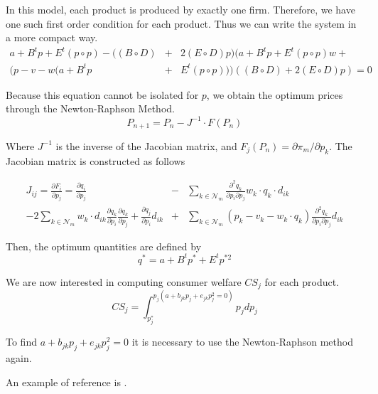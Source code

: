 \documentclass[12pt]{article}
\begin{document}
In this model, each product is produced by exactly one firm. Therefore, we have one such first order condition for each product. Thus we can write the system in a more compact way.
\begin{eqnarray*}
a + B^t p + E^t (p \circ p) - ((B \circ D) &+& 2(E \circ D)p) (a + B^t p + E^t (p \circ p) w + \\
(p - v - w(a + B^t p &+& E^t (p \circ p)))((B \circ D) + 2 (E \circ D) p) = 0
\end{eqnarray*}

Because this equation cannot be isolated for $p$, we obtain the optimum prices through the Newton-Raphson Method.
\begin{equation*}
P_{n+1} = P_n - J^{-1} \cdot F(P_n)
\end{equation*}

Where $J^{-1}$ is the inverse of the Jacobian matrix, and $F_j(P_n) = \partial \pi_m / \partial p_k$. The Jacobian matrix is constructed as follows

\begin{eqnarray*}
J_{ij} = \frac{\partial F_i}{\partial p_j} = \frac{\partial q_i}{\partial p_j} &-& \sum_{k \in \mathcal{N}_m} \frac{\partial^2 q_k}{\partial p_i \partial p_j} w_k \cdot q_k \cdot d_{ik}\\
 - 2\sum_{k \in \mathcal{N}_m} w_k \cdot d_{ik} \frac{\partial q_k}{\partial p_i} \frac{\partial q_k}{\partial p_j} + \frac{\partial q_j}{\partial p_i} d_{ik} &+& \sum_{k \in \mathcal{N}_m} (p_k - v_k - w_k \cdot q_k) \frac{\partial^2 q_k}{\partial p_i \partial p_j}d_{ik}
\end{eqnarray*}

Then, the optimum quantities are defined by 
\begin{equation*}
q^* = a + B^t p^* + E^t p^{*2}
\end{equation*}

We are now interested in computing consumer welfare $CS_j$ for each product.
\begin{equation*}
CS_j = \int_{p_j^*}^{p_j(a + b_{jk} p_j + e_{jk} p_j^2 = 0)} p_j dp_j
\end{equation*}

To find $a + b_{jk} p_j + e_{jk} p_j^2 = 0$ it is necessary to use the Newton-Raphson method again. 


An example of reference is \cite{abc}.
\end{document}
